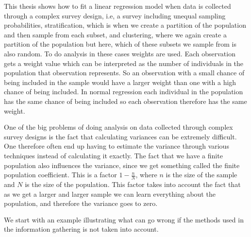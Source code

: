 \documentclass{article}
\begin{document}
This thesis shows how to fit
a linear regression model when data is collected through a complex survey design, i.e,
a survey including unequal sampling probabilities, stratification, which is when we
create a partition of the population and then sample from each subset, and
clustering, where we again create a partition of the population but here, which
of these subsets we sample from is also random.
To do analysis in these cases weights are used. Each observation gets a weight
value which can be interpreted as the number of individuals in the population
that observation represents. So an observation with a small chance of being
included in the sample would have a larger weight than one with a high chance of
being included.
In normal regression each individual in the population has the same chance of
being included so each observation therefore has the same weight.

One of the big problems of doing analysis on data collected through complex
survey designs is the fact that calculating variances can be extremely
difficult. One therefore often end up having to estimate the variance through
various techniques instead of calculating it exactly.
The fact that we have a finite population also influences the variance, since we
get something called the finite population coefficient. This is a factor \(1 -
\frac{n}{N}\), where \(n\) is the size of the sample and \(N\) is the size of
the population. This factor takes into account the fact that as we get a larger
and larger sample we can learn everything about the population, and therefore
the variance goes to zero.

We start
with an example illustrating what can go wrong if the methods used in the
information gathering is not taken into account.
\end{document}
